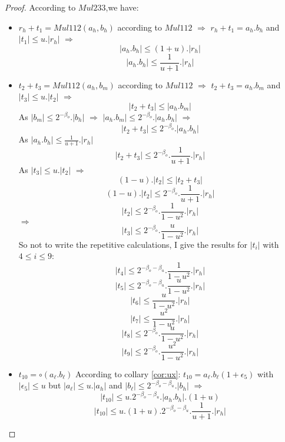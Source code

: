 \begin{proof} \color{-yellow}
According to $Mul233$,we have:
\begin{itemize}
    \item $r_h + t_1 = Mul112(a_h,b_h)$ according to $Mul112$ $\Rightarrow$  $r_h + t_1 = a_h.b_h $ and  $\lvert t_1 \rvert \le u. \lvert r_h \rvert$ $\Rightarrow$
    $$\lvert a_h.b_h \rvert \le (1 + u). \lvert r_h \rvert $$
    $$\lvert a_h.b_h \rvert \le \frac{1}{u+1}. \lvert r_h \rvert $$
    \item $t_2 + t_3 = Mul112(a_h,b_m)$ according to $Mul112$ $\Rightarrow$ $t_2 + 
    t_3 = a_h.b_m$ and $\lvert t_3 \rvert \le u. \lvert t_2 \rvert$ $\Rightarrow$
    $$\lvert t_2 + t_3 \rvert \le \lvert a_h.b_m \rvert$$
    As $\lvert b_m \rvert \le 2^{-\beta_o}. \lvert b_h \rvert$ $\Rightarrow$ $\lvert a_h.b_m \rvert \le 2^{-\beta_o}. \lvert a_h.b_h \rvert$ $\Rightarrow$
    $$\lvert t_2 + t_3 \rvert \le 2^{-\beta_o}. \lvert a_h.b_h \rvert$$
    As $\lvert a_h.b_h \rvert \le \frac{1}{u+1}. \lvert r_h \rvert $
    $$\lvert t_2 + t_3 \rvert \le 2^{-\beta_o}. \frac{1}{u+1}. \lvert r_h \rvert$$
    As $\lvert t_3 \rvert \le u. \lvert t_2 \rvert$ $\Rightarrow$
    $$ (1-u). \lvert t_2 \rvert \le \lvert t_2 + t_3 \rvert $$
    $$ (1-u). \lvert t_2 \rvert \le 2^{-\beta_o}. \frac{1}{u+1}. \lvert r_h \rvert $$
     $$  \lvert t_2 \rvert \le 2^{-\beta_o}. \frac{1}{1-u^2}. \lvert r_h \rvert $$
     $\Rightarrow$
     $$  \lvert t_3 \rvert \le 2^{-\beta_o}. \frac{u}{1-u^2}. \lvert r_h \rvert $$
     So not to write the repetitive calculations, I give the results for $\lvert t_i \rvert $ with $4 \le i \le 9$:
     $$  \lvert t_4 \rvert \le 2^{-\beta_o -\beta_u}. \frac{1}{1-u^2}. \lvert r_h \rvert $$
     $$  \lvert t_5 \rvert \le 2^{-\beta_o -\beta_u}. \frac{u}{1-u^2}. \lvert r_h \rvert $$
      $$  \lvert t_6 \rvert \le \frac{u}{1-u^2}. \lvert r_h \rvert $$
      $$  \lvert t_7 \rvert \le \frac{u^2}{1-u^2}. \lvert r_h \rvert $$
      $$  \lvert t_8 \rvert \le 2^{-\beta_o}. \frac{u}{1-u^2}. \lvert r_h \rvert $$
      $$  \lvert t_9 \rvert \le 2^{-\beta_o}. \frac{u^2}{1-u^2}. \lvert r_h \rvert $$
    \item $t_{10} = \circ(a_{\ell}.b_{\ell})$ According to collary \ref{cor:ux}:  $t_{10} = a_{\ell}.b_{\ell}(1+\epsilon_5)$ with $\lvert \epsilon_5 \rvert \le u$ 
    but $\lvert a_{\ell} \rvert \le u. \lvert a_h \rvert$ and $\lvert b_{\ell} \rvert \le 2^{-\beta_o -\beta_u}. \lvert b_h \rvert$ $\Rightarrow$
    $$\lvert t_{10} \rvert \le u.2^{-\beta_o -\beta_u}.\lvert a_h.b_h \rvert.(1+u)$$
    $$\lvert t_{10} \rvert \le u.(1+u).2^{-\beta_o -\beta_u}.\frac{1}{u+1}. \lvert r_h \rvert$$

\end{itemize}
\end{proof}
